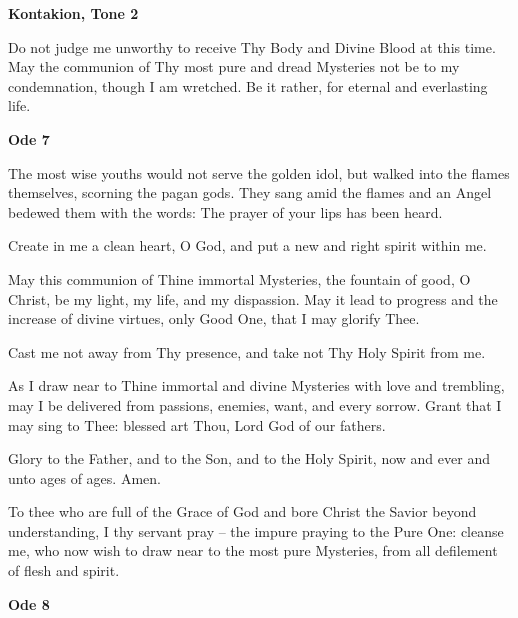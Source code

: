 \begin{center}
	\textbf{Kontakion, Tone 2}
\end{center}

Do not judge me unworthy to receive Thy Body and Divine Blood at this time. May the communion of Thy most pure and dread Mysteries not be to my condemnation, though I am wretched. Be it rather, for eternal and everlasting life.

\begin{center}
	\textbf{Ode 7}
\end{center}

\begin{hang}
\noindent{}The most wise youths would not serve the golden idol, but walked into the flames themselves, scorning the pagan gods. They sang amid the flames and an Angel bedewed them with the words: The prayer of your lips has been heard.

Create in me a clean heart, O God, and put a new and right spirit within me.

May this communion of Thine immortal Mysteries, the fountain of good, O Christ, be my light, my life, and my dispassion. May it lead to progress and the increase of divine virtues, only Good One, that I may glorify Thee.

Cast me not away from Thy presence, and take not Thy Holy Spirit from me.

As I draw near to Thine immortal and divine Mysteries with love and trembling, may I be delivered from passions, enemies, want, and every sorrow. Grant that I may sing to Thee: blessed art Thou, Lord God of our fathers.

Glory to the Father, and to the Son, and to the Holy Spirit, now and ever and unto ages of ages. Amen.

To thee who are full of the Grace of God and bore Christ the Savior beyond understanding, I thy servant pray -- the impure praying to the Pure One: cleanse me, who now wish to draw near to the most pure Mysteries, from all defilement of flesh and spirit.

\end{hang}

\begin{center}
	\textbf{Ode 8}
\end{center}

